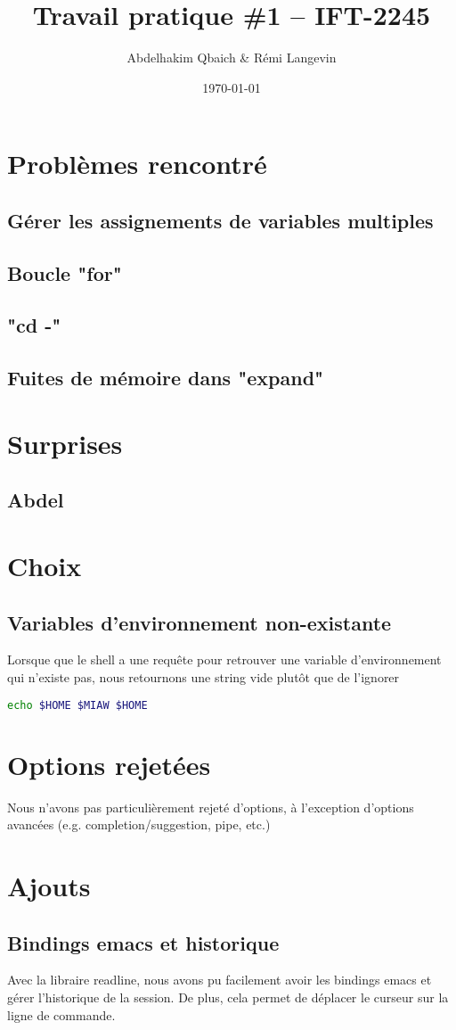 \documentclass[a4paper]{article}
\title{Travail pratique \#1 -- IFT-2245}
\author{Abdelhakim Qbaich & Rémi Langevin}
\date{\today}
\begin{document}
\maketitle

\section*{Probl\`emes rencontr\'e}
    \subsection*{G\'erer les assignements de variables multiples}
    \subsection*{Boucle "for"}
    \subsection*{"cd -"}
    \subsection*{Fuites de m\'emoire dans "expand"}

\section*{Surprises}
    \subsection*{Abdel}

\section*{Choix}
    \subsection*{Variables d'environnement non-existante}
    Lorsque que le shell a une requ\^ete pour retrouver une variable
    d'environnement qui n'existe pas, nous retournons une string vide plut\^ot
    que de l'ignorer
        \begin{lstlisting}[language=bash]
        echo $HOME $MIAW $HOME
        \end{lstlisting}

\section*{Options rejet\'ees}
    Nous n'avons pas particuli\`erement rejet\'e d'options, \`a
    l'exception d'options avanc\'ees (e.g. completion/suggestion, pipe, etc.)

\section*{Ajouts}
    \subsection*{Bindings emacs et historique}
        Avec la libraire readline, nous avons pu facilement avoir les bindings
        emacs et g\'erer l'historique de la session. De plus, cela permet de
        d\'eplacer le curseur sur la ligne de commande.
\end{document}
